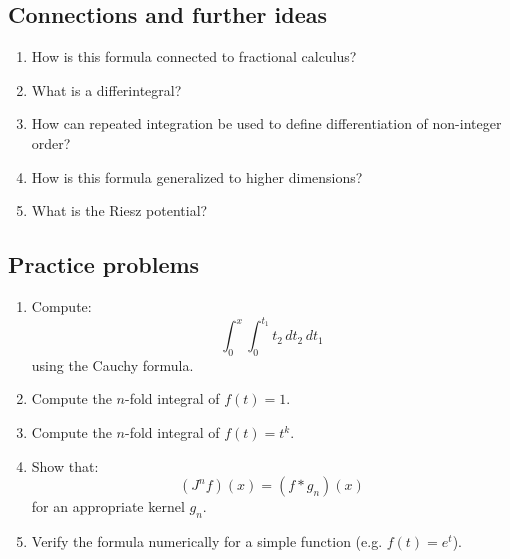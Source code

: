 \subsection{Connections and further ideas}
\begin{enumerate}[resume]
  \item How is this formula connected to fractional calculus?
  \item What is a differintegral?
  \item How can repeated integration be used to define differentiation of non-integer order?
  \item How is this formula generalized to higher dimensions?
  \item What is the Riesz potential?
\end{enumerate}

\subsection{Practice problems}
\begin{enumerate}[resume]
  \item Compute:
    \[
      \int_0^x \int_0^{t_1} t_2 \, dt_2 \, dt_1
    \]
    using the Cauchy formula.
  \item Compute the $n$-fold integral of $f(t) = 1$.
  \item Compute the $n$-fold integral of $f(t) = t^k$.
  \item Show that:
    \[
      (J^n f)(x) = (f * g_n)(x)
    \]
    for an appropriate kernel $g_n$.
  \item Verify the formula numerically for a simple function (e.g. $f(t)=e^t$).
\end{enumerate}
